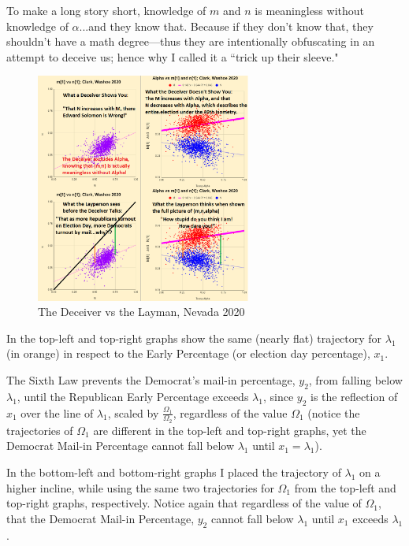 \documentclass[preprint,13pt]{elsarticle}
\begin{document}
To make a long story short, knowledge of $m$ and $n$ is meaningless without knowledge of $\alpha$...and they know that. Because if they don't know that, they shouldn't have a math degree---thus they are intentionally obfuscating in an attempt to deceive us; hence why I called it a ``trick up their sleeve."
\begin{figure}[bp!]
\begin{center}
\caption{The Deceiver vs the Layman, Nevada 2020}
\includegraphics[width=200pt]{MvsN Clark.png}
\end{center}
\end{figure}
\newpage
\newpage
In the top-left and top-right graphs show the same (nearly flat) trajectory for $\lambda_{1}$ (in orange) in respect to the Early Percentage (or election day percentage), $x_{1}$.

The Sixth Law prevents the Democrat's mail-in percentage, $y_{2}$, from falling below $\lambda_{1}$, until the Republican Early Percentage exceeds $\lambda_{1}$, since $y_{2}$ is the reflection of $x_{1}$ over the line of $\lambda_{1}$, scaled by $\frac{\Omega_{1}}{\Omega_{2}}$, regardless of the value $\Omega_{1}$ (notice the trajectories of $\Omega_{1}$ are different in the top-left and top-right graphs, yet the Democrat Mail-in Percentage cannot fall below $\lambda_{1}$ until $x_{1}=\lambda_{1}$).

In the bottom-left and bottom-right graphs I placed the trajectory of $\lambda_{1}$ on a higher incline, while using the same two trajectories for $\Omega_{1}$ from the top-left and top-right graphs, respectively. Notice again that regardless of the value of $\Omega_{1}$, that the Democrat Mail-in Percentage, $y_{2}$ cannot fall below $\lambda_{1}$ until $x_{1}$ exceeds $\lambda_{1}$. 
\end{document}
